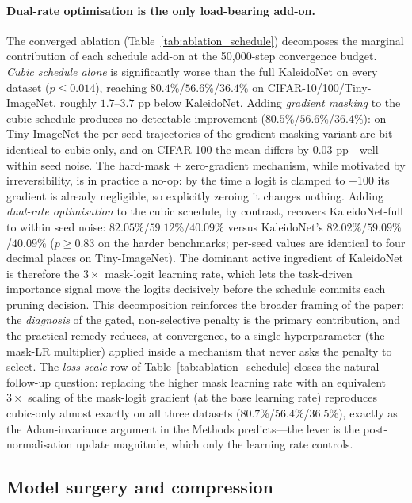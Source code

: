 \documentclass[fleqn,10pt]{article}
\begin{document}
\paragraph{Dual-rate optimisation is the only load-bearing add-on.}
The converged ablation (Table~\ref{tab:ablation_schedule})
decomposes the marginal contribution of each schedule add-on at the
50{,}000-step convergence budget. \emph{Cubic schedule alone} is
significantly worse than the full KaleidoNet on every dataset
($p\!\leq\!0.014$), reaching $80.4\%$/$56.6\%$/$36.4\%$ on
CIFAR-10/100/Tiny-ImageNet, roughly $1.7$--$3.7$ pp below KaleidoNet.
Adding \emph{gradient masking} to the cubic schedule produces no
detectable improvement ($80.5\%$/$56.6\%$/$36.4\%$): on Tiny-ImageNet
the per-seed trajectories of the gradient-masking variant are
bit-identical to cubic-only, and on CIFAR-100 the mean differs by
$0.03$ pp---well within seed noise. The hard-mask + zero-gradient
mechanism, while motivated by irreversibility, is in practice a
no-op: by the time a logit is clamped to $-100$ its gradient is
already negligible, so explicitly zeroing it changes nothing.
Adding \emph{dual-rate optimisation} to the cubic schedule, by
contrast, recovers KaleidoNet-full to within seed noise:
$82.05\%$/$59.12\%$/$40.09\%$ versus KaleidoNet's
$82.02\%$/$59.09\%$/$40.09\%$ ($p\!\geq\!0.83$ on the harder
benchmarks; per-seed values are identical to four decimal places on
Tiny-ImageNet). The dominant active ingredient of KaleidoNet is
therefore the $3{\times}$ mask-logit learning rate, which lets the
task-driven importance signal move the logits decisively before the
schedule commits each pruning decision. This decomposition
reinforces the broader framing of the paper: the \emph{diagnosis} of
the gated, non-selective penalty is the primary contribution, and
the practical remedy reduces, at convergence, to a single
hyperparameter (the mask-LR multiplier) applied inside a mechanism
that never asks the penalty to select. The \emph{loss-scale} row
of Table~\ref{tab:ablation_schedule} closes the natural follow-up
question: replacing the higher mask learning rate with an equivalent
$3\times$ scaling of the mask-logit gradient (at the base learning
rate) reproduces cubic-only almost exactly on all three datasets
($80.7\%$/$56.4\%$/$36.5\%$), exactly as the Adam-invariance
argument in the Methods predicts---the lever is the
post-normalisation update magnitude, which only the learning rate
controls.

\subsection*{Model surgery and compression}
\end{document}
